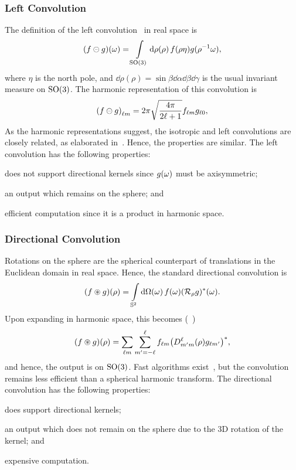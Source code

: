 \subsubsection{Left Convolution}

The definition of the left convolution~\cite{Kennedy2011,Driscoll1994} in real space is
%
\begin{equation}
	(f \circleddash g)(\omega)
	= \int\limits_{\text{SO(3)}} \dd{\rho(\rho)} f(\rho\eta) g(\rho^{-1}\omega),
\end{equation}
%
where \({\eta}\) is the north pole, and \(\dd{\rho(\rho)}=\sin{\beta} \dd{\alpha} \dd{\beta} \dd{\gamma}\) is the usual invariant measure on \(\text{SO(3)}{}\).
The harmonic representation of this convolution is
%
\begin{equation}
	{(f \circleddash g)}_{\ell m}
	= 2\pi \sqrt{\frac{4\pi}{2\ell+1}} {f}_{\ell m} {g}_{\ell 0},
\end{equation}
%
As the harmonic representations suggest, the isotropic and left convolutions are closely related, as elaborated in~\cite{Kennedy2011}.
Hence, the properties are similar.
The left convolution has the following properties:
%
\begin{inparaenum}[(i)]
	\item does not support directional kernels since \(g(\omega)\) must be axisymmetric;
	\item an output which remains on the sphere; and
	\item efficient computation since it is a product in harmonic space.
\end{inparaenum}

\subsubsection{Directional Convolution}

Rotations on the sphere are the spherical counterpart of translations in the Euclidean domain in real space.
Hence, the standard directional convolution is
%
\begin{equation}\label{eq:chapter2_directional_convolution}
	(f \circledast g)(\rho)
	= \int\limits_{\mathbb{S}^{2}} \dd{\Omega(\omega)} f(\omega) (\mathcal{R}_{\rho}g)^{\ast}(\omega).
\end{equation}
%
Upon expanding in harmonic space, this becomes (\eg{}~\cite{McEwen2007,Wandelt2001})
%
\begin{equation}
	(f \circledast g) (\rho)
	= \sum\limits_{\ell m} \sum\limits_{m'=-\ell}^{\ell} {f}_{\ell m} \big( D^{\ell}_{m'm}(\rho) g_{\ell m'} \big)^{\ast},
\end{equation}
%
and hence, the output is on \(\text{SO(3)}{}\).
Fast algorithms exist~\cite{McEwen2007,Wandelt2001,Wiaux2007,McEwen2013}, but the convolution remains less efficient than a spherical harmonic transform.
The directional convolution has the following properties:
%
\begin{inparaenum}[(i)]
	\item does support directional kernels;
	\item an output which does not remain on the sphere due to the 3D rotation of the kernel; and
	\item expensive computation.
\end{inparaenum}

